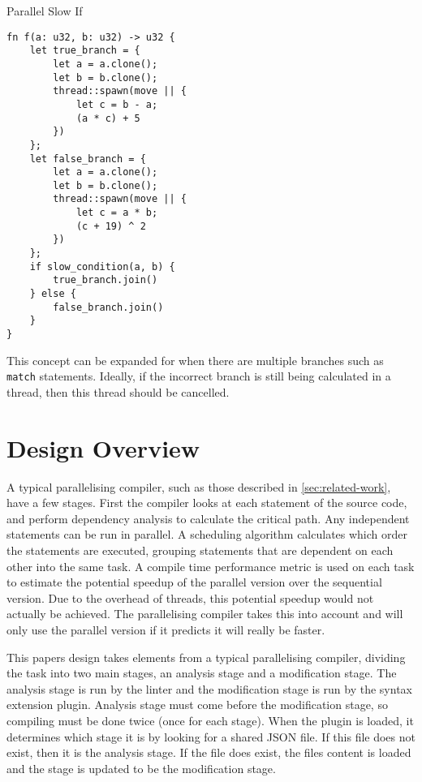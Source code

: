 \documentclass[conference]{IEEEtran}
\begin{document}
\begin{algorithm}
\caption{Parallel Slow If}
\label{code:par-slowif}
\begin{verbatim}
fn f(a: u32, b: u32) -> u32 {
    let true_branch = {
        let a = a.clone();
        let b = b.clone();
        thread::spawn(move || {
            let c = b - a;
            (a * c) + 5
        })
    };
    let false_branch = {
        let a = a.clone();
        let b = b.clone();
        thread::spawn(move || {
            let c = a * b;
            (c + 19) ^ 2
        })
    };
    if slow_condition(a, b) {
        true_branch.join()
    } else {
        false_branch.join()
    }
}

\end{verbatim}
\end{algorithm}

This concept can be expanded for when there are multiple branches such as \texttt{match} statements. Ideally, if the incorrect branch is still being calculated in a thread, then this thread should be cancelled.

\section{Design Overview}
\label{sec:design}
A typical parallelising compiler, such as those described in \autoref{sec:related-work}, have a few stages. First the compiler looks at each statement of the source code, and perform dependency analysis to calculate the critical path. Any independent statements can be run in parallel. A scheduling algorithm calculates which order the statements are executed, grouping statements that are dependent on each other into the same task. A compile time performance metric is used on each task to estimate the potential speedup of the parallel version over the sequential version. Due to the overhead of threads, this potential speedup would not actually be achieved. The parallelising compiler takes this into account and will only use the parallel version if it predicts it will really be faster.

This papers design takes elements from a typical parallelising compiler, dividing the task into two main stages, an analysis stage and a modification stage. The analysis stage is run by the linter and the modification stage is run by the syntax extension plugin. Analysis stage must come before the modification stage, so compiling must be done twice (once for each stage).
When the plugin is loaded, it determines which stage it is by looking for a shared JSON file. If this file does not exist, then it is the analysis stage. If the file does exist, the files content is loaded and the stage is updated to be the modification stage.
\end{document}
